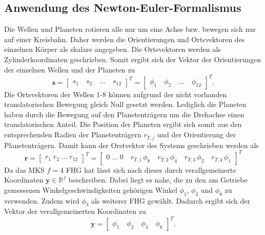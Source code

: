 \subsection{Anwendung des Newton-Euler-Formalismus}\label{ssec:AnwNE}
Die Wellen und Planeten rotieren alle nur um eine Achse bzw. bewegen sich nur auf einer Kreisbahn. Daher werden die Orientierungen und Ortsvektoren des einzelnen Körper als skalare angegeben. Die Ortsvektoren werden als Zylinderkoordinaten geschrieben. Somit ergibt sich der Vektor der Orientierungen der einzelnen Wellen und der Planeten zu 
\begin{equation}
\pmb{s} = \begin{bmatrix} s_{1}\quad s_{2}\quad \dots \quad s_{12} \end{bmatrix}^T = \begin{bmatrix} \phi_{1}\quad \phi_{2}\quad \dots \quad \phi_{12} \end{bmatrix}^T.
\end{equation} 
Die Ortsvektoren der Wellen 1-8 können aufgrund der nicht vorhanden translatorischen Bewegung gleich Null gesetzt werden. Lediglich die Planeten haben durch die Bewegung auf den Planetenträgern um die Drehachse einen translatorischen Anteil. Die Position der Planeten ergibt sich somit aus den entsprechenden Radien der Planetenträgern $r_{T,j}$ und der Orientierung der Planetenträgern. Damit kann der Orstvektor des Systems geschrieben werden als
\begin{equation}
\pmb{r} = \begin{bmatrix} r_{1}\; r_{2}\; \dots \; r_{12} \end{bmatrix}^T = \begin{bmatrix} 0\; \dots \; 0 \quad r_{T,1}\,\phi_8 \quad r_{T,2}\,\phi_4 \quad r_{T,3}\,\phi_2 \quad r_{T,4}\,\phi_1 \end{bmatrix}^T
\end{equation}
Da das MKS $f=4$ FHG hat lässt sich nach \cite{Schiehlen.2017} dieses durch verallgemeinerte Koordinaten $\pmb{y}\in \mathbb{R}^f$ beschreiben. Dabei liegt es nahe, die zu den am Getriebe gemessenen Winkelgeschwindigkeiten gehörigen Winkel $\phi_{1}$, $\phi_{2}$ und $\phi_{8}$ zu verwenden. Zudem wird $\phi_{3}$ als weiterer FHG gewählt. Dadurch ergibt sich der Vektor der verallgemeinerten Koordinaten zu
\begin{equation}
\pmb{y} = \begin{bmatrix} \phi_{1}\quad \phi_{2}\quad \phi_{3}\quad \phi_{8} \end{bmatrix}^T.
\end{equation}
